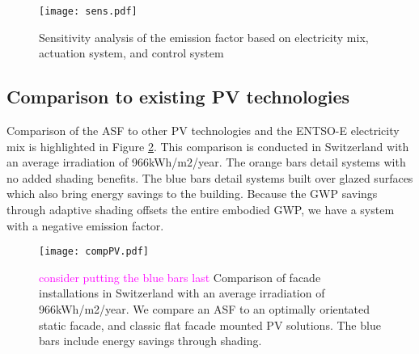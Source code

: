 \begin{figure}[H]
\begin{center}
\texttt{[image: sens.pdf]}
\caption{Sensitivity analysis of the emission factor based on electricity mix, actuation system, and control system}
\label{fig:sens}
\end{center}
\end{figure}

\subsection{Comparison to existing PV technologies}

Comparison of the ASF to other PV technologies and the ENTSO-E electricity mix is highlighted in Figure \ref{fig:compPV}. This comparison is conducted in Switzerland with an average irradiation of 966kWh/m$2$/year.
The orange bars detail systems with no added shading benefits. The blue bars detail systems built over glazed surfaces which also bring energy savings to the building. Because the GWP savings through adaptive shading offsets the entire embodied GWP, we have a system with a negative emission factor.




\begin{figure}[H]
\begin{center}
\texttt{[image: compPV.pdf]}
\caption{\textcolor{magenta}{consider putting the blue bars last} Comparison of facade installations in Switzerland with an average irradiation of 966kWh/m2/year.
We compare an ASF to an optimally orientated static facade, and classic flat facade mounted PV solutions. The blue bars include energy savings through shading.}
\label{fig:compPV}
\end{center}
\end{figure}




